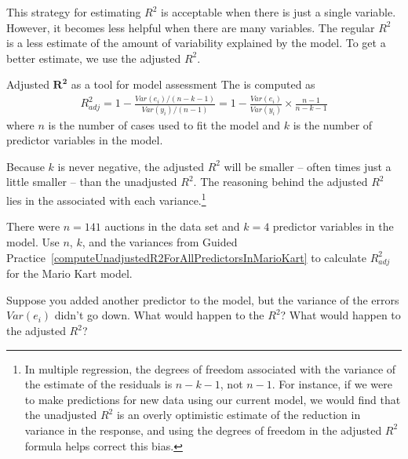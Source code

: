 This strategy for estimating $R^2$ is acceptable when there is just a single variable. However, it becomes less helpful when there are many variables. The regular $R^2$ is a less estimate of the amount of variability explained by the model. To get a better estimate, we use the adjusted $R^2$.

\begin{onebox}{Adjusted $\mathbf{R^2}$ as a tool for model assessment}
The  is computed as
\begin{align*}
R_{adj}^{2} = 1-\frac{Var(e_i) / (n-k-1)}{Var(y_i) / (n-1)}
	= 1-\frac{Var(e_i)}{Var(y_i)} \times \frac{n-1}{n-k-1}
\end{align*}
where $n$ is the number of cases used to fit the model and $k$ is the number of predictor variables in the model.
\end{onebox}

Because $k$ is never negative, the adjusted $R^2$ will be smaller -- often times just a little smaller -- than the unadjusted $R^2$. The reasoning behind the adjusted $R^2$ lies in the  associated with each variance.\footnote{In multiple regression, the degrees of freedom associated with the variance of the estimate of the residuals is $n-k-1$, not $n-1$. For instance, if we were to make predictions for new data using our current model, we would find that the unadjusted $R^2$ is an overly optimistic estimate of the reduction in variance in the response, and using the degrees of freedom in the adjusted $R^2$ formula helps correct this bias.}

\begin{exercisewrap}
\begin{nexercise}
There were $n=141$ auctions in the  data set and $k=4$ predictor variables in the model. Use $n$, $k$, and the variances from Guided Practice~\ref{computeUnadjustedR2ForAllPredictorsInMarioKart} to calculate $R_{adj}^2$ for the Mario Kart model.\footnotemark
\end{nexercise}
\end{exercisewrap}

\begin{exercisewrap}
\begin{nexercise}
Suppose you added another predictor to the model, but the variance of the errors $Var(e_i)$ didn't go down. What would happen to the $R^2$? What would happen to the adjusted $R^2$?\hspace{0.7mm}\footnotemark
\end{nexercise}
\end{exercisewrap}

